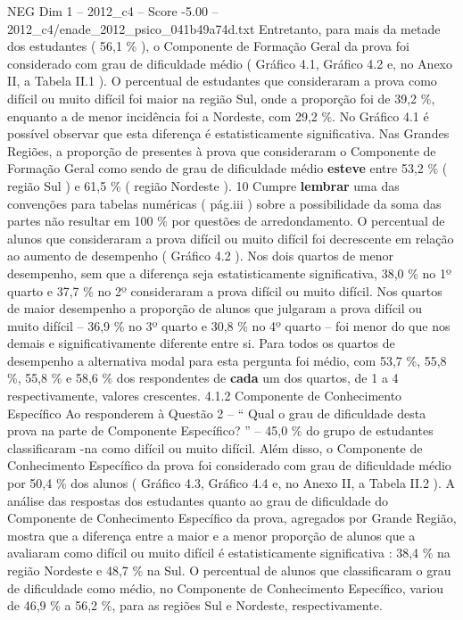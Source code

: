 \begin{textsample}{NEG Dim 1 – 2012\_c4 – Score -5.00 – 2012\_c4/enade\_2012\_psico\_041b49a74d.txt}
Entretanto, para mais da metade dos estudantes ( 56,1 \% ), o Componente de Formação Geral da prova foi considerado com grau de dificuldade médio ( Gráfico 4.1, Gráfico 4.2 e, no Anexo II, a Tabela II.1 ).
O percentual de estudantes que consideraram a prova como difícil ou muito difícil foi maior na região Sul, onde a proporção foi de 39,2 \%, enquanto a de menor incidência foi a Nordeste, com 29,2 \%.
No Gráfico 4.1 é possível observar que esta diferença é estatisticamente significativa.
Nas Grandes Regiões, a proporção de presentes à prova que consideraram o Componente de Formação Geral como sendo de grau de dificuldade médio \textbf{esteve} entre 53,2 \% ( região Sul ) e 61,5 \% ( região Nordeste ). 10 Cumpre \textbf{lembrar} uma das convenções para tabelas numéricas ( pág.iii ) sobre a possibilidade da soma das partes não resultar em 100 \% por questões de arredondamento.
O percentual de alunos que consideraram a prova difícil ou muito difícil foi decrescente em relação ao aumento de desempenho ( Gráfico 4.2 ).
Nos dois quartos de menor desempenho, sem que a diferença seja estatisticamente significativa, 38,0 \% no 1º quarto e 37,7 \% no 2º consideraram a prova difícil ou muito difícil.
Nos quartos de maior desempenho a proporção de alunos que julgaram a prova difícil ou muito difícil – 36,9 \% no 3º quarto e 30,8 \% no 4º quarto – foi menor do que nos demais e significativamente diferente entre si.
Para todos os quartos de desempenho a alternativa modal para esta pergunta foi médio, com 53,7 \%, 55,8 \%, 55,8 \% e 58,6 \% dos respondentes de \textbf{cada} um dos quartos, de 1 a 4 respectivamente, valores crescentes. 4.1.2 Componente de Conhecimento Específico Ao responderem à Questão 2 – “ Qual o grau de dificuldade desta prova na parte de Componente Específico? ” – 45,0 \% do grupo de estudantes classificaram -na como difícil ou muito difícil.
Além disso, o Componente de Conhecimento Específico da prova foi considerado com grau de dificuldade médio por 50,4 \% dos alunos ( Gráfico 4.3, Gráfico 4.4 e, no Anexo II, a Tabela II.2 ).
A análise das respostas dos estudantes quanto ao grau de dificuldade do Componente de Conhecimento Específico da prova, agregados por Grande Região, mostra que a diferença entre a maior e a menor proporção de alunos que a avaliaram como difícil ou muito difícil é estatisticamente significativa : 38,4 \% na região Nordeste e 48,7 \% na Sul.
O percentual de alunos que classificaram o grau de dificuldade como médio, no Componente de Conhecimento Específico, variou de 46,9 \% a 56,2 \%, para as regiões Sul e Nordeste, respectivamente.

\end{textsample}
